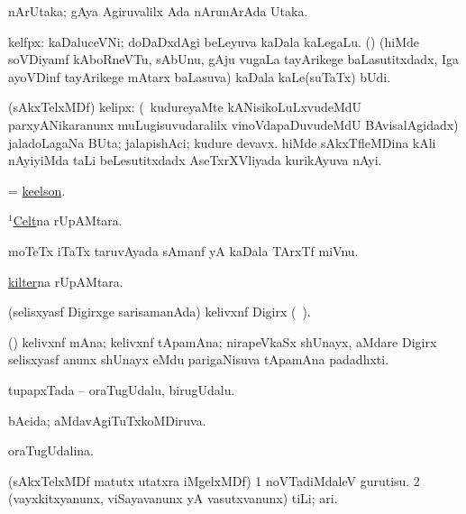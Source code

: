 \bentry
{}
\gl{\nA}
\bmng
nArUtaka; gAya Agiruvalilx Ada nArunArAda Utaka. 
\emng
\eentry

\bentry
{}
\gl{\nA}
\bmng
kelfpx: 
\banum
{} kaDaluceVNi; doDaDxdAgi beLeyuva kaDala kaLegaLu. 
 (\ravi) (hiMde soVDiyamf kAboRneVTu, sAbUnu, gAju \mo vugaLa tayArikege baLasutitxdadx, Iga ayoVDinf tayArikege mAtarx baLasuva) kaDala kaLe(suTaTx) bUdi. 
\eanum
\emng
\eentry

\bentry
{}
\gl{\nA}
\bmng
(sAkxTelxMDf) kelipx: 
\banum
{} (\sA\ kudureyaMte kANisikoLuLxvudeMdU parxyANikaranunx muLugisuvudaralilx vinoVdapaDuvudeMdU BAvisalAgidadx) jaladoLagaNa BUta; jalapishAci; kudure devavx. 
 hiMde sAkxTfleMDina kAli  nAyiyiMda taLi beLesutitxdadx AseTxrXVliyada kurikAyuva nAyi. 
\eanum
\emng
\eentry

\bentry
{}
\gl{\nA}
\bmng
 = \hyperlink{keelson}{keelson}. 
\emng
\eentry

\bentry
{}
\gl{\nA}
\bmng
\hyperref{kandict_c.pdf}{C}{Celt(1)}{$^1$Celt}na rUpAMtara. 
\emng
\eentry

\bentry
{}
\gl{\nA}
\bmng
moTeTx iTaTx taruvAyada sAmanf yA kaDala TArxTf miVnu. 
\emng
\eentry

\bentry
{}
\gl{\nA}
\bmng
\hyperlink{kilter}{kilter}na rUpAMtara. 
\emng
\eentry

\bentry
{}
\gl{\nA}
\bmng
(selisxyasf Digirxge sarisamanAda) kelivxnf Digirx (\saMkiSx\ ). 
\emng
\eentry

\bentry
{}
\gl{\nA}
\bmng
(\Bwvi) kelivxnf mAna; kelivxnf tApamAna; nirapeVkaSx shUnayx, aMdare  Digirx selisxyasf anunx shUnayx eMdu parigaNisuva tApamAna padadhxti. 
\emng
\eentry

\bentry
{}
\gl{\nA}
\bmng
tupapxTada -- oraTugUdalu, birugUdalu. 
\emng
\eentry

\bentry
{}
\gl{\gu}
\bmng
bAcida; aMdavAgiTuTxkoMDiruva. 
\emng
\eentry

\bentry
{}
\gl{\gu}
\bmng
oraTugUdalina. 
\emng
\eentry

\bentry
{}
\gl{\sakirx}
\bmng
(sAkxTelxMDf matutx utatxra iMgelxMDf) 
\bnum
\num{1} noVTadiMdaleV gurutisu. 
\num{2} (vayxkitxyanunx, viSayavanunx yA vasutxvanunx) tiLi; ari. 
\enum
\emng
\eentry

